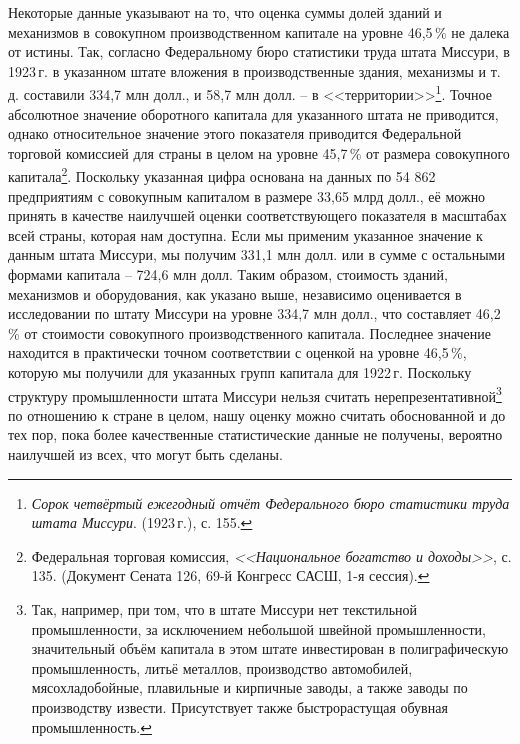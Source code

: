 \documentclass[leqno]{article}  %
\begin{document}
\par
Некоторые данные указывают на то, что оценка суммы долей зданий и механизмов в совокупном производственном капитале на уровне 46,5\,\% не далека от истины. Так, согласно Федеральному бюро статистики труда штата Миссури, в 1923\,г. в указанном штате вложения в производственные здания, механизмы и т. д. составили 334,7 млн долл., и 58,7 млн долл. -- в <<территории>>\footnote{\emph{Сорок четвёртый ежегодный отчёт Федерального бюро статистики труда штата Миссури}. (1923\,г.), с. 155.}. Точное абсолютное значение оборотного капитала для указанного штата не приводится, однако относительное значение этого показателя приводится Федеральной торговой комиссией для страны в целом на уровне 45,7\,\% от размера совокупного капитала\footnote{Федеральная торговая комиссия, \emph{<<Национальное богатство и доходы>>}, с. 135. (Документ Сената 126, 69-й Конгресс САСШ, 1-я сессия).}. Поскольку указанная цифра основана на данных по 54 862 предприятиям с совокупным капиталом в размере 33,65 млрд долл., её можно принять в качестве наилучшей оценки соответствующего показателя в масштабах всей страны, которая нам доступна. Если мы применим указанное значение к данным штата Миссури, мы получим 331,1 млн долл. или в сумме с остальными формами капитала -- 724,6 млн долл. Таким образом, стоимость зданий, механизмов и оборудования, как указано выше, независимо оценивается в исследовании по штату Миссури на уровне 334,7 млн долл., что составляет 46,2\,\% от стоимости совокупного производственного капитала. Последнее значение находится в практически точном соответствии с оценкой на уровне 46,5\,\%, которую мы получили для указанных групп капитала для 1922\,г. Поскольку структуру промышленности штата Миссури нельзя считать нерепрезентативной\footnote{Так, например, при том, что в штате Миссури нет текстильной промышленности, за исключением небольшой швейной промышленности, значительный объём капитала в этом штате инвестирован в полиграфическую промышленность, литьё металлов, производство автомобилей, мясохладобойные, плавильные и кирпичные заводы, а также заводы по производству извести. Присутствует также быстрорастущая обувная промышленность.} по отношению к стране в целом, нашу оценку можно считать обоснованной и до тех пор, пока более качественные статистические данные не получены, вероятно наилучшей из всех, что могут быть сделаны.
\end{document}
